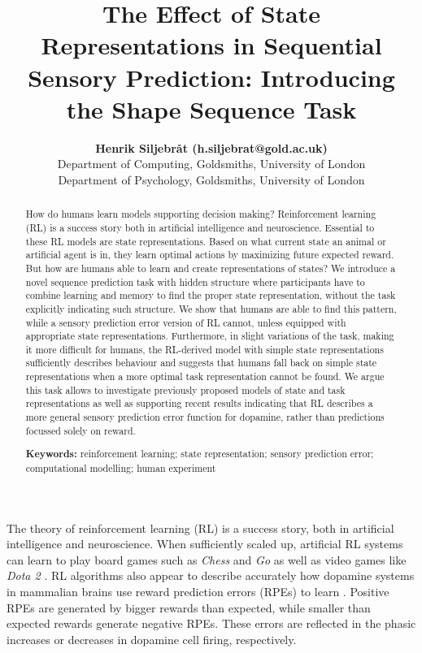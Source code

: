 \documentclass[10pt,letterpaper]{article}
\title{The Effect of State Representations in Sequential Sensory Prediction: Introducing the Shape Sequence Task}
\author{{\large \bf Henrik Siljebråt (h.siljebrat@gold.ac.uk)} \\
  Department of Computing, Goldsmiths, University of London
  \AND {\large \bf Alan Pickering (a.pickering@gold.ac.uk)} \\
  Department of Psychology, Goldsmiths, University of London}
\begin{document}
\maketitle


\begin{abstract}
How do humans learn models supporting decision making? Reinforcement learning (RL) is a success story both in artificial intelligence and neuroscience. Essential to these RL models are state representations. Based on what current state an animal or artificial agent is in, they learn optimal actions by maximizing future expected reward. But how are humans able to learn and create representations of states? We introduce a novel sequence prediction task with hidden structure where participants have to combine learning and memory to find the proper state representation, without the task explicitly indicating such structure. We show that humans are able to find this pattern, while a sensory prediction error version of RL cannot, unless equipped with appropriate state representations. Furthermore, in slight variations of the task, making it more difficult for humans, the RL-derived model with simple state representations sufficiently describes behaviour and suggests that humans fall back on simple state representations when a more optimal task representation cannot be found. We argue this task allows to investigate previously proposed models of state and task representations as well as supporting recent results indicating that RL describes a more general sensory prediction error function for dopamine, rather than predictions focussed solely on reward.

\textbf{Keywords:} 
reinforcement learning; state representation; sensory prediction error; computational modelling; human experiment
\end{abstract}


The theory of reinforcement learning (RL) is a success story, both in artificial intelligence and neuroscience. When sufficiently scaled up, artificial RL systems can learn to play board games such as \emph{Chess} and \emph{Go} \cite{Silver2018-gk} as well as video games like \emph{Dota 2} \cite{OpenAI2019-xb}. RL algorithms also appear to describe accurately how dopamine systems in mammalian brains use reward prediction errors (RPEs) to learn \cite{Schultz2015-oz}. Positive RPEs are generated by bigger rewards than expected, while smaller than expected rewards generate negative RPEs. These errors are reflected in the phasic \cite{Schultz2016-ul} increases or decreases in dopamine cell firing, respectively.
\end{document}
